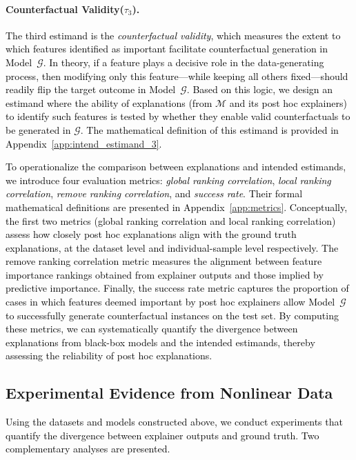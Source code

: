 \documentclass[mnsc,blindrev]{informs3}
\begin{document}
\paragraph{Counterfactual Validity($\tau_3$).} 
\textcolor{black}{The third estimand is the \textit{counterfactual validity}, which measures the extent to which features identified as important facilitate counterfactual generation in Model~$\mathcal{G}$. In theory, if a feature plays a decisive role in the data-generating process, then modifying only this feature—while keeping all others fixed—should readily flip the target outcome in Model~$\mathcal{G}$. Based on this logic, we design an estimand where the ability of explanations (from $\mathcal{M}$ and its post hoc explainers) to identify such features is tested by whether they enable valid counterfactuals to be generated in $\mathcal{G}$. The mathematical definition of this estimand is provided in Appendix~\ref{app:intend_estimand_3}.}

\textcolor{black}{To operationalize the comparison between explanations and intended estimands, we introduce four evaluation metrics: \textit{global ranking correlation}, \textit{local ranking correlation}, \textit{remove ranking correlation}, and \textit{success rate}. Their formal mathematical definitions are presented in Appendix~\ref{app:metrics}. Conceptually, the first two metrics (global ranking correlation and local ranking correlation) assess how closely post hoc explanations align with the ground truth explanations, at the dataset level and individual-sample level respectively. The remove ranking correlation metric measures the alignment between feature importance rankings obtained from explainer outputs and those implied by predictive importance. Finally, the success rate metric captures the proportion of cases in which features deemed important by post hoc explainers allow Model~$\mathcal{G}$ to successfully generate counterfactual instances on the test set. By computing these metrics, we can systematically quantify the divergence between explanations from black-box models and the intended estimands, thereby assessing the reliability of post hoc explanations.}

\subsection{Experimental Evidence from Nonlinear Data}
\label{sec:nonlinear_results}

\textcolor{black}{Using the datasets and models constructed above, we conduct experiments that quantify the divergence between explainer outputs and ground truth. Two complementary analyses are presented.}
\end{document}
